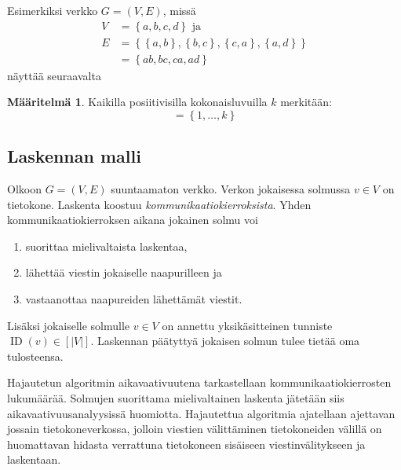 \documentclass[finnish]{tktltiki2}
\theoremstyle{definition}
\newtheorem{maar}[lau]{Määritelmä}
\theoremstyle{remark}
\newcommand{\set}[1]{\left\{ #1 \right\}}
\DeclareMathOperator{\id}{ID}
\begin{document}
Esimerkiksi verkko $G = (V,E)$, missä
%
\begin{align*}
    V &= \set{a,b,c,d} \text{ ja}\\
    E &= \set{ \set{a,b}, \set{b,c}, \set{c,a}, \set{a,d}} \\
      &= \set{ab, bc, ca, ad}
\end{align*}
%
näyttää seuraavalta
%
\begin{center}
\end{center}

\begin{maar}
    Kaikilla posiitivisilla kokonaisluvuilla $k$ merkitään:
    \begin{equation*}
        [k] = \set{1, \dots, k}
    \end{equation*}
\end{maar}

\subsection{Laskennan malli}

Olkoon $G = (V,E)$ suuntaamaton verkko. Verkon jokaisessa solmussa $v \in V$ on
tietokone. Laskenta koostuu \emph{kommunikaatiokierroksista}. Yhden
kommunikaatiokierroksen aikana jokainen solmu voi

\begin{enumerate}
    \item suorittaa mielivaltaista laskentaa,
    \item lähettää viestin jokaiselle naapurilleen ja
    \item vastaanottaa naapureiden lähettämät viestit.
\end{enumerate}

Lisäksi jokaiselle solmulle $v \in V$ on annettu yksikäsitteinen tunniste
$\id(v) \in [|V|]$. Laskennan päätyttyä jokaisen solmun tulee
tietää oma tulosteensa.

Hajautetun algoritmin aikavaativuutena tarkastellaan kommunikaatiokierrosten
lukumäärää. Solmujen suorittama mielivaltainen laskenta jä\-te\-tään siis
aikavaativuusanalyysissä huomiotta. Hajautettua algoritmia ajatellaan ajettavan
jossain tietokoneverkossa, jolloin viestien välittäminen tietokoneiden välillä
on huomattavan hidasta verrattuna tietokoneen sisäiseen viestinvälitykseen ja
laskentaan.
\end{document}
